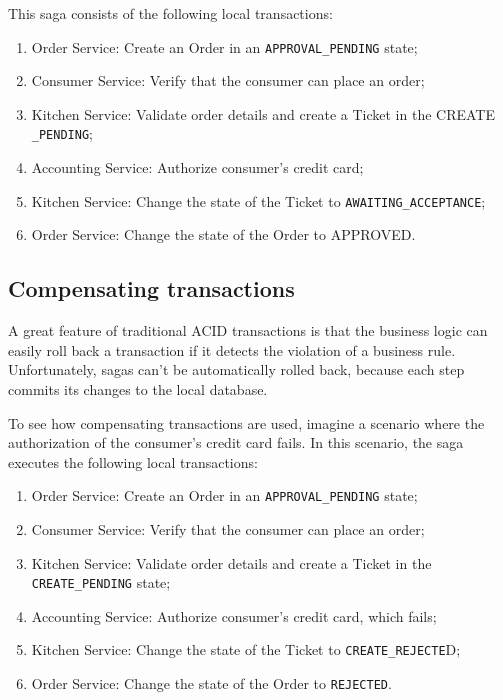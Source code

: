 \documentclass[conference]{IEEEtran}
\begin{document}
This saga consists of the following local transactions:

\begin{enumerate}
  \item Order Service: Create an Order in an \texttt{APPROVAL\_PENDING} state;
  \item Consumer Service: Verify that the consumer can place an order;
  \item Kitchen Service: Validate order details and create a Ticket in the CREATE \texttt{\_PENDING};
  \item Accounting Service: Authorize consumer’s credit card;
  \item Kitchen Service: Change the state of the Ticket to \texttt{AWAITING\_ACCEPTANCE};
  \item Order Service: Change the state of the Order to APPROVED.
\end{enumerate}

\subsection{Compensating transactions}

A great feature of traditional ACID transactions is that the business logic can easily roll back a transaction if it detects the violation of a business rule. Unfortunately, sagas can’t be automatically rolled back, because each step commits its changes to the local database. 

To see how compensating transactions are used, imagine a scenario where the authorization of the consumer’s credit card fails. In this scenario, the saga executes the following local transactions:

\begin{enumerate}
  \item Order Service: Create an Order in an \texttt{APPROVAL\_PENDING} state;
  \item Consumer Service: Verify that the consumer can place an order;
  \item Kitchen Service: Validate order details and create a Ticket in the \texttt{CREATE\_PENDING} state;
  \item Accounting Service: Authorize consumer’s credit card, which fails;
  \item Kitchen Service: Change the state of the Ticket to \texttt{CREATE\_REJECTE}D;
  \item Order Service: Change the state of the Order to \texttt{REJECTED}.
\end{enumerate}
\end{document}

